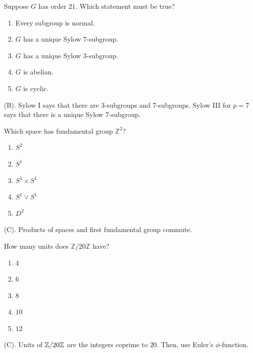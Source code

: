 \begin{exercise}
Suppose $G$ has order $21$. Which statement must be true?
\begin{enumerate}[label=(\Alph*)]
    \item Every subgroup is normal.
    \item $G$ has a unique Sylow $7$-subgroup.
    \item $G$ has a unique Sylow $3$-subgroup.
    \item $G$ is abelian.
    \item $G$ is cyclic.
\end{enumerate}
\end{exercise}
\begin{solution}
(B). Sylow I says that there are $3$-subgroups and $7$-subgroups.
Sylow III for $p = 7$ says that there is a unique Sylow $7$-subgroup.
\end{solution}

\begin{exercise}
Which space has fundamental group $\mathbb{Z}^2$?
\begin{enumerate}[label=(\Alph*)]
    \item $S^2$
    \item $S^1$
    \item $S^1\times S^1$
    \item $S^1\vee S^1$
    \item $D^2$
\end{enumerate}
\end{exercise}
\begin{solution}
(C). Products of spaces and first fundamental group commute.
\end{solution}

\begin{exercise}
How many units does $\mathbb{Z}/20\mathbb{Z}$ have?
\begin{enumerate}[label=(\Alph*)]
    \item $4$
    \item $6$
    \item $8$
    \item $10$
    \item $12$
\end{enumerate}
\end{exercise}
\begin{solution}
(C). Units of $\mathbb{Z}/20\mathbb{Z}$ are the integers coprime to $20$. Then, use Euler's $\phi$-function.
\end{solution}

